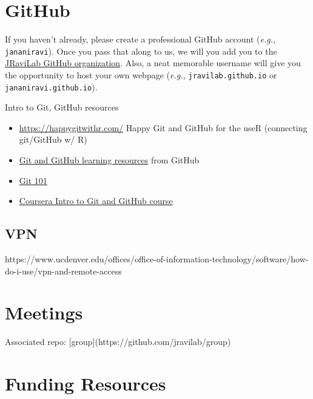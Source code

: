 \documentclass[
  letterpaper,
  DIV=11,
  numbers=noendperiod]{scrreprt}
\begin{document}
\hypertarget{github}{%
\chapter{GitHub}\label{github}}

If you haven't already, please create a professional GitHub account
(\emph{e.g.,} \texttt{jananiravi}). Once you pass that along to us, we
will you add you to the \href{//github.com/jravilab}{JRaviLab GitHub
organization}. Also, a neat memorable username will give you the
opportunity to host your own webpage (\emph{e.g.,}
\texttt{jravilab.github.io} or \texttt{jananiravi.github.io}).

Intro to Git, GitHub resources

\begin{itemize}
\item
  \url{https://happygitwithr.com/} Happy Git and GitHub for the useR
  (connecting git/GitHub w/ R)
\item
  \href{https://docs.github.com/en/get-started/quickstart/git-and-github-learning-resources}{Git
  and GitHub learning resources} from GitHub
\item
  \href{https://product.hubspot.com/blog/git-and-github-tutorial-for-beginners}{Git
  101}
\item
  \href{https://www.coursera.org/learn/introduction-git-github}{Coursera
  Intro to Git and GitHub course}
\end{itemize}

\hypertarget{vpn}{%
\section{VPN}\label{vpn}}

https://www.ucdenver.edu/offices/office-of-information-technology/software/how-do-i-use/vpn-and-remote-access


\hypertarget{meetings}{%
\chapter{Meetings}\label{meetings}}

Associated repo: {[}group{]}(https://github.com/jravilab/group)


\hypertarget{funding-resources}{%
\chapter{Funding Resources}\label{funding-resources}}
\end{document}
